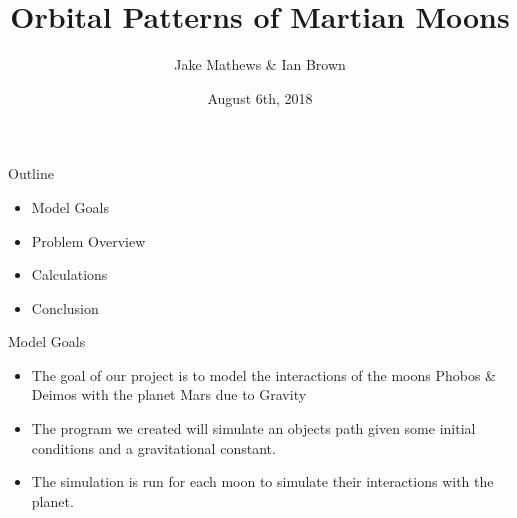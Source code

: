 \documentclass{beamer}  %
\title[Orbital Patterns of Martian Moons]{Orbital Patterns of Martian Moons}
\author{Jake Mathews \& Ian Brown}
\institute{Wentworth Institute of Technology}
\date{August 6th, 2018}
\begin{document}
\begin{frame}
\titlepage
\end{frame}


\begin{frame}{Outline} %

 \begin{itemize}
  \item Model Goals
  \item Problem Overview
  \item Calculations
  \item Conclusion
 \end{itemize}

\end{frame}


\begin{frame}{Model Goals} %
\begin{itemize}
	\item The goal of our project is to model the interactions of the moons Phobos \& Deimos with the planet Mars due to Gravity
	\item The program we created will simulate an objects path given some initial conditions and a gravitational constant. 
	\item The simulation is run for each moon to simulate their interactions with the planet.
\end{itemize}
\end{frame}
\end{document}
